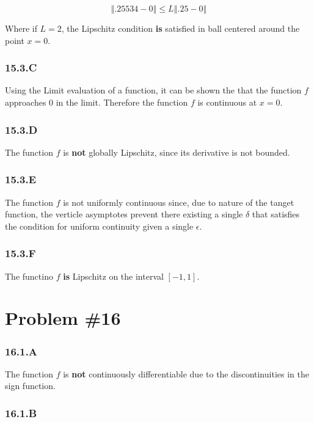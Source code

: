 \documentclass[12px]{article}
\begin{document}
$$
\left\Vert .25534 - 0 \right\Vert \leq L \left\Vert .25 - 0 \right\Vert
$$

Where if $L =2$, the Lipschitz condition \textbf{is} satisfied in ball centered around the point $x=0$.

\subsubsection*{15.3.C}

Using the Limit evaluation of a function, it can be shown the that the function $f$ approaches $0$ in the limit. Therefore the function $f$ is continuous at $x=0$.

\subsubsection*{15.3.D}

The function $f$ is \textbf{not} globally Lipschitz, since its derivative is not bounded.

\subsubsection*{15.3.E}

The function $f$ is not uniformly continuous since, due to nature of the tanget function, the verticle asymptotes prevent there existing a single $\delta$ that satisfies the condition for uniform continuity given a single $\epsilon$.


\subsubsection*{15.3.F}
The functino $f$ \textbf{is} Lipschitz on the interval $[-1, 1]$.



\section{Problem \#16}

\subsubsection*{16.1.A}

The function $f$ is \textbf{not} continuously differentiable due to the discontinuities in the sign function.
\subsubsection*{16.1.B}
\end{document}
